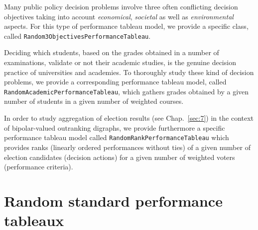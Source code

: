 Many public policy decision problems involve three often conflicting decision objectives taking into account \emph{economical}, \emph{societal} as well as \emph{environmental} aspects. For this type of performance tableau model, we provide a specific class, called \texttt{Random3ObjectivesPerformanceTableau}.

Deciding which students, based on the grades obtained in a number of examinations, validate or not their academic studies, is the genuine decision practice of universities and academies. To thoroughly study these kind of decision problems, we provide a corresponding performance tableau model, called \texttt{RandomAcademic\-PerformanceTableau}, which gathers grades obtained by a given number of students in a given number of weighted courses.    

In order to study aggregation of election results (see Chap.~\vref{sec:7}) in the context of bipolar-valued outranking digraphs, we provide furthermore a specific performance tableau model called \texttt{RandomRankPerformanceTableau} which provides ranks (linearly ordered performances without ties) of a given number of election candidates (decision actions) for a given number of weighted voters (performance criteria).
 
\section{Random standard performance tableaux}
\label{sec:6.2}
    
